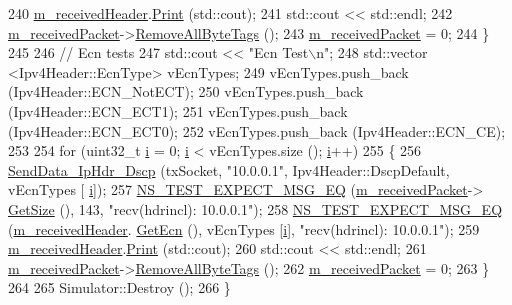 \begin{DoxyCode}
240       \hyperlink{classIpv4HeaderTest_a667ff4bfd280469a2814685903b1159f}{m\_receivedHeader}.\hyperlink{classns3_1_1Ipv4Header_ab823da57c446e48a5689b0772ce0081e}{Print} (std::cout);
241       std::cout << std::endl;
242       \hyperlink{classIpv4HeaderTest_a4806396ea5249b214fce8a349f40b07b}{m\_receivedPacket}->\hyperlink{classns3_1_1Packet_a083f54c9db31aeff30551a9e20fcda42}{RemoveAllByteTags} ();
243       \hyperlink{classIpv4HeaderTest_a4806396ea5249b214fce8a349f40b07b}{m\_receivedPacket} = 0;
244     \}
245 
246   \textcolor{comment}{// Ecn tests}
247   std::cout << \textcolor{stringliteral}{"Ecn Test\(\backslash\)n"};
248   std::vector <Ipv4Header::EcnType> vEcnTypes;
249   vEcnTypes.push\_back (Ipv4Header::ECN\_NotECT);
250   vEcnTypes.push\_back (Ipv4Header::ECN\_ECT1);
251   vEcnTypes.push\_back (Ipv4Header::ECN\_ECT0);
252   vEcnTypes.push\_back (Ipv4Header::ECN\_CE);
253 
254   \textcolor{keywordflow}{for} (uint32\_t \hyperlink{bernuolliDistribution_8m_a6f6ccfcf58b31cb6412107d9d5281426}{i} = 0; \hyperlink{bernuolliDistribution_8m_a6f6ccfcf58b31cb6412107d9d5281426}{i} < vEcnTypes.size (); \hyperlink{bernuolliDistribution_8m_a6f6ccfcf58b31cb6412107d9d5281426}{i}++)
255     \{
256       \hyperlink{classIpv4HeaderTest_afbd0cfc4212b3a0d8846faa662cbc7bc}{SendData\_IpHdr\_Dscp} (txSocket, \textcolor{stringliteral}{"10.0.0.1"}, Ipv4Header::DscpDefault, vEcnTypes [
      \hyperlink{bernuolliDistribution_8m_a6f6ccfcf58b31cb6412107d9d5281426}{i}]);
257       \hyperlink{group__testing_ga7304ba46a28d8cf08dfdfd6499cf7068}{NS\_TEST\_EXPECT\_MSG\_EQ} (\hyperlink{classIpv4HeaderTest_a4806396ea5249b214fce8a349f40b07b}{m\_receivedPacket}->
      \hyperlink{classns3_1_1Packet_a462855c9929954d4301a4edfe55f4f1c}{GetSize} (), 143, \textcolor{stringliteral}{"recv(hdrincl): 10.0.0.1"});
258       \hyperlink{group__testing_ga7304ba46a28d8cf08dfdfd6499cf7068}{NS\_TEST\_EXPECT\_MSG\_EQ} (\hyperlink{classIpv4HeaderTest_a667ff4bfd280469a2814685903b1159f}{m\_receivedHeader}.
      \hyperlink{classns3_1_1Ipv4Header_ac5b818a97ed69188202d2c66ca7717c0}{GetEcn} (), vEcnTypes [\hyperlink{bernuolliDistribution_8m_a6f6ccfcf58b31cb6412107d9d5281426}{i}], \textcolor{stringliteral}{"recv(hdrincl): 10.0.0.1"});
259       \hyperlink{classIpv4HeaderTest_a667ff4bfd280469a2814685903b1159f}{m\_receivedHeader}.\hyperlink{classns3_1_1Ipv4Header_ab823da57c446e48a5689b0772ce0081e}{Print} (std::cout);
260       std::cout << std::endl;
261       \hyperlink{classIpv4HeaderTest_a4806396ea5249b214fce8a349f40b07b}{m\_receivedPacket}->\hyperlink{classns3_1_1Packet_a083f54c9db31aeff30551a9e20fcda42}{RemoveAllByteTags} ();
262       \hyperlink{classIpv4HeaderTest_a4806396ea5249b214fce8a349f40b07b}{m\_receivedPacket} = 0;
263     \}
264 
265   Simulator::Destroy ();
266 \}
\end{DoxyCode}


